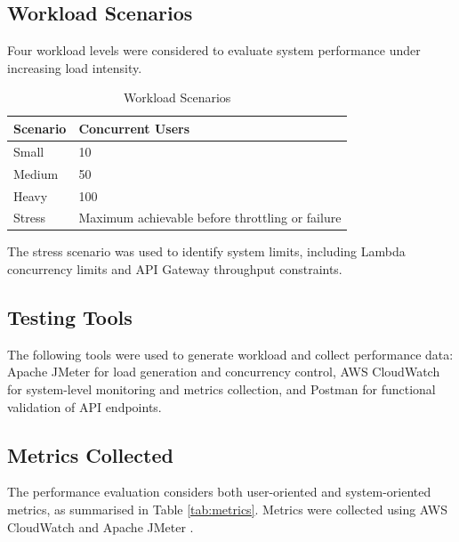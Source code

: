\documentclass[11pt,a4paper,twocolumn]{article}
\begin{document}
\subsection{Workload Scenarios}

Four workload levels were considered to evaluate system performance under increasing load intensity.


\begin{table}[!htbp]
\centering

\begin{tabular}{p{} p{}}
\toprule
Scenario & Concurrent Users \\
\midrule
Small & 10 \\
Medium & 50 \\
Heavy & 100 \\
Stress & Maximum achievable before throttling or failure \\
\bottomrule
\end{tabular}

\caption{Workload Scenarios}
\label{tab:workloads}
\end{table}

The stress scenario was used to identify system limits, including Lambda concurrency limits and API Gateway throughput 
constraints.


\subsection{Testing Tools}

The following tools were used to generate workload and collect performance data: Apache JMeter for load generation and concurrency control, AWS CloudWatch for system-level monitoring and metrics collection, and Postman for functional validation of API endpoints.


\subsection{Metrics Collected}

The performance evaluation considers both user-oriented and system-oriented metrics, as summarised in Table \ref{tab:metrics}. Metrics were collected using AWS CloudWatch and Apache JMeter \citep{jmeter_docs}.
\end{document}
